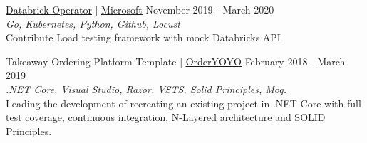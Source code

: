\documentclass[margin, 10pt, hidelinks]{res} %
\newcommand{\tab}{\hspace*{1em}} %
\begin{document}
\begin{resume}
\href{https://github.com/microsoft/azure-databricks-operator/pull/173}{\underline{Databrick Operator}} | \href{https://www.microsoft.com/}{\underline{Microsoft}} \hfill November 2019  - March 2020 \\
{\it Go, Kubernetes, Python, Github, Locust} \\
\tab Contribute Load testing framework with mock Databricks API


Takeaway Ordering Platform Template | \href{https://orderyoyo.com/}{\underline{OrderYOYO}} \hfill February 2018  - March 2019 \\
{\it .NET Core, Visual Studio, Razor, VSTS, Solid Principles, Moq.} \\
\tab Leading the development of recreating an existing project in .NET Core with full test coverage, continuous integration, N-Layered architecture and SOLID Principles.





\end{resume}
\end{document}
